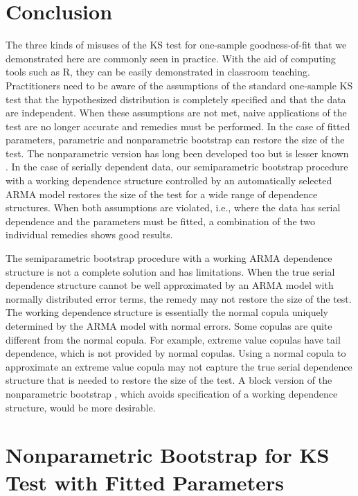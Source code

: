 \documentclass[12pt, letterpaper, titlepage]{article}
\begin{document}
\section{Conclusion}
\label{sec:conclusion}

The three kinds of misuses of the KS test for one-sample goodness-of-fit that we
demonstrated here are commonly seen in practice. With the aid of computing tools
such as R, they can be easily demonstrated in classroom teaching. Practitioners
need to be aware of the assumptions of the standard one-sample KS test that the
hypothesized distribution is completely specified and that the data are
independent. When these assumptions are not met, naive applications of the test
are no longer accurate and remedies must be performed. In the
case of fitted parameters, parametric and nonparametric bootstrap can restore
the size of the test. The nonparametric version has long been developed too but
is lesser known \citep{babu2004goodness}. In the case of serially dependent data,
our semiparametric bootstrap procedure with a working dependence structure
controlled by an automatically selected ARMA model restores the size of the test
for a wide range of dependence structures.
When both assumptions are violated, i.e., where the data has serial 
dependence and the parameters must be fitted, a combination of the two
individual remedies shows good results.


The semiparametric bootstrap procedure with a working ARMA dependence structure
is not a complete solution and has limitations. When the true serial dependence
structure cannot be well approximated by an ARMA model with normally distributed
error terms, the remedy may not restore the size of the test. The working
dependence structure is essentially the normal copula uniquely determined by the
ARMA model with normal errors. Some copulas are quite different from the normal
copula. For example, extreme value copulas have tail dependence, which is not
provided by normal copulas.
Using a normal copula to approximate an extreme value copula may not capture the
true serial dependence structure that is needed to restore the size of the
test. A block version of the nonparametric bootstrap \citep{babu2004goodness},
which avoids specification of a working dependence structure, would be more
desirable.


\appendix

\section{Nonparametric Bootstrap for KS Test with Fitted Parameters}
\end{document}
